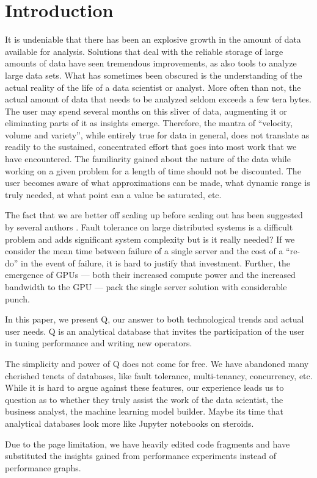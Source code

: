 \section{Introduction}

It is undeniable that there has been an explosive growth in the 
amount of data available for analysis. Solutions that 
deal with the reliable storage of large amounts of data have seen tremendous
improvements, as also tools to analyze large data sets. What has sometimes been
obscured is the understanding of the actual reality of the life of a data
scientist or analyst. More often than not, the actual amount of data that needs
to be analyzed seldom exceeds a few tera bytes\cite{Dittrich2015}. The user may spend
several months on this sliver of data, augmenting it or eliminating parts of it
as insights emerge. Therefore, the mantra of ``velocity, volume and variety'',
while entirely true for data in general, does not translate as readily to the
sustained, concentrated effort that goes into most work that we have
encountered. The familiarity gained about the nature of the data 
while working on a given problem for a length of time should not be discounted. The
user becomes aware of what approximations can be made, what dynamic range is
truly needed, at what point can a value be saturated, etc.

The fact that we are better off scaling up before scaling out has been suggested
by several authors \cite{Rowstron2012,Dittrich2015}. 
Fault tolerance on large distributed systems is a difficult
problem and adds significant system complexity but is it really needed?
If we consider the mean time between failure of a single server and
the cost of a ``re-do'' in the event of failure,
it is hard to justify that investment. 
Further, the emergence of GPUs --- both their increased compute power and the
increased  bandwidth to the GPU --- pack the single server solution with
considerable punch.

In this paper, we present Q, our answer to both technological trends and actual
user needs. Q is an analytical database that invites the participation of the
user in tuning performance and writing new operators. 

The simplicity and power of Q does not come for free. We have abandoned many
cherished tenets of databases, like fault tolerance, multi-tenancy, concurrency,
etc. While it is hard to argue against these features, our experience leads us
to question as to whether they truly assist the work of the data scientist, the
business analyst, the machine learning model builder. Maybe its time that
analytical databases look more like Jupyter notebooks on steroids.

Due to the page limitation, we have heavily edited code fragments and
have substituted the insights gained from performance experiments instead of
performance graphs.
